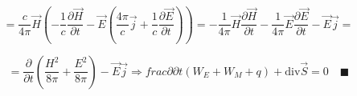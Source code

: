 \[
= \frac{c}{4\pi} \vec{H} \left( -\frac{1}{c}\frac{\partial\vec{H}}{\partial t} -\vec{E}\left( \frac{4\pi}{c}\vec{j}+\frac{1}{c}\frac{\partial\vec{E}}{\partial t}    \right)  \right) =-\frac{1}{4\pi}\vec{H}\frac{\partial\vec{H}}{\partial t}-\frac{1}{4\pi}\vec{E}\frac{\partial\vec{E}}{\partial t}-\vec{E}\vec{j}=    
\]

\[
=\frac{\partial}{\partial t}\left( \frac{H^2}{8\pi}+\frac{E^2}{8\pi}   \right) -\vec{E}\vec{j}\Rightarrow frac{\partial}{\partial t} \left( W_E+W_M+q \right)+\mathrm{div}\vec{S}=0\quad \blacksquare 
\]
